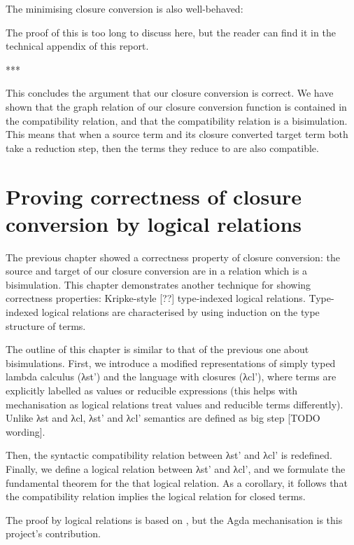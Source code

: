 \documentclass[bsc,frontabs,oneside,singlespacing,parskip,deptreport]{infthesis}
\theoremstyle{definition}
\theoremstyle{lemma}
\begin{document}

The minimising closure conversion  is also well-behaved:


The proof of this is too long to discuss here, but the reader can find
it in the technical appendix of this report.

***

This concludes the argument that our closure conversion is correct. We
have shown that the graph relation of our closure conversion function
is contained in the compatibility relation, and that the compatibility
relation is a bisimulation. This means that when a source term and its
closure converted target term both take a reduction step, then the
terms they reduce to are also compatible.

\chapter{Proving correctness of closure conversion by logical
  relations}
\label{cha:proof-logic-relat}

The previous chapter showed a correctness property of closure
conversion: the source and target of our closure conversion are in a
relation which is a bisimulation. This chapter demonstrates another
technique for showing correctness properties: Kripke-style [??]
type-indexed logical relations. Type-indexed logical relations are
characterised by using induction on the type structure of terms.

The outline of this chapter is similar to that of the previous one
about bisimulations. First, we introduce a modified representations of
simply typed lambda calculus (λst') and the language with closures
(λcl'), where terms are explicitly labelled as values or reducible
expressions (this helps with mechanisation as logical relations treat
values and reducible terms differently). Unlike λst and λcl, λst' and
λcl' semantics are defined as big step [TODO wording].

Then, the syntactic compatibility relation between λst' and λcl' is
redefined. Finally, we define a logical relation between λst' and
λcl', and we formulate the fundamental theorem for the that logical
relation. As a corollary, it follows that the compatibility relation
implies the logical relation for closed terms.

The proof by logical relations is based on
\cite{DBLP:conf/popl/MinamideMH96}, but the Agda mechanisation is this
project's contribution.
\end{document}
